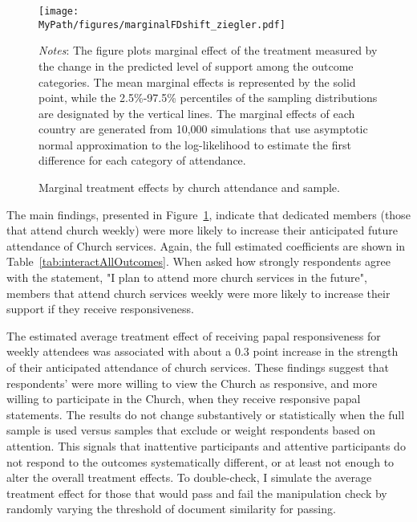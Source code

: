 \documentclass[12pt,letterpaper]{article}
\newcommand*{\MyPath}{../../}%
\begin{document}
 

\begin{figure}[h!]
	\centering
	\caption{\footnotesize{Marginal treatment effects by church attendance and sample.}}
	\label{fig:marginalFDshiftZiegler}
	
	\texttt{[image: \\MyPath/figures/marginalFDshift\_ziegler.pdf]}\\
	\vspace{.1cm}
	\raggedright   \footnotesize{\textit{Notes}: The figure plots marginal effect of the treatment measured by the change in the predicted level of support among the outcome categories. %
		The mean marginal effects is represented by the solid point, while the 2.5\%-97.5\% percentiles of the sampling distributions are designated by the vertical lines. The marginal effects of each country are generated from 10,000 simulations that use asymptotic normal approximation to the log-likelihood to estimate the first difference for each category of attendance.}\\
\end{figure}

The main findings, presented in Figure~\ref{fig:marginalFDshiftZiegler}, indicate that dedicated members (those that attend church weekly) were more likely to increase their anticipated future attendance of Church services. Again, the full estimated coefficients are shown in Table~\ref{tab:interactAllOutcomes}. When asked how strongly respondents agree with the statement, "I plan to attend more church services in the future", members that attend church services weekly were more likely to increase their support if they receive responsiveness. %

The estimated average treatment effect of receiving papal responsiveness for weekly attendees was associated with about a 0.3 point increase in the strength of their anticipated attendance of church services. These findings suggest that respondents' were more willing to view the Church as responsive, and more willing to participate in the Church, when they receive responsive papal statements. The results do not change substantively or statistically when the full sample is used versus samples that exclude or weight respondents based on attention. This signals that inattentive participants and attentive participants do not respond to the outcomes systematically different, or at least not enough to alter the overall treatment effects. To double-check, I simulate the average treatment effect for those that would pass and fail the manipulation check by randomly varying the threshold of document similarity for passing.
\end{document}
